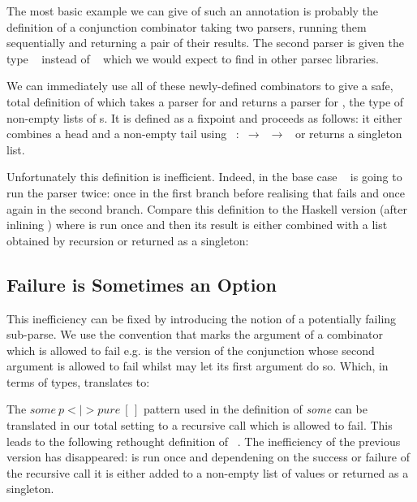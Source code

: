 
The most basic example we can give of such an annotation is probably the
definition of a conjunction combinator \AF{\_<\&>\_} taking two parsers,
running them sequentially and returning a pair of their results. The second
parser is given the type \mbox{\BOX{}  } instead of
\mbox{ } which we would expect to find in other parsec libraries.


We can immediately use all of these newly-defined combinators to give
a safe, total definition of  which takes a parser for 
and returns a parser for  , the type of non-empty
lists of s. It is defined as a fixpoint and proceeds as follows:
it either combines a head and a non-empty tail using \mbox{\AF{$\_::^{+}\_$} :
   $\rightarrow$   $\rightarrow$
   } or returns a singleton list.


 Unfortunately this definition is inefficient.
Indeed, in the base case \mbox{ } is going to run the parser
 twice: once in the first branch before realising that 
fails and once again in the second branch. Compare this definition to
the Haskell version (after inlining ) where  is run once
and then its result is either combined with a list obtained by recursion
or returned as a singleton:


\subsection{Failure is Sometimes an Option}\label{sec:failure}

This inefficiency can be fixed by introducing the notion of a potentially
failing sub-parse. We use the convention that  marks the argument
of a combinator which is allowed to fail e.g.  is the version
of the conjunction \AF{<\&>} whose second argument is allowed to fail
whilst  may let its first argument do so. Which, in terms of
types, translates to:


The $\textit{some}~\textit{p} \mathbin{<\!\!|\!\!>} \textit{pure}~ [\,]$ pattern
used in the definition of \textit{some} can be translated in our total
setting to a recursive call which is allowed to fail. This leads to the following
rethought definition of \mbox{ }. The inefficiency of the previous
version has disappeared:  is run once and dependening on the success
or failure of the recursive call it is either added to a non-empty list of
values or returned as a singleton.

